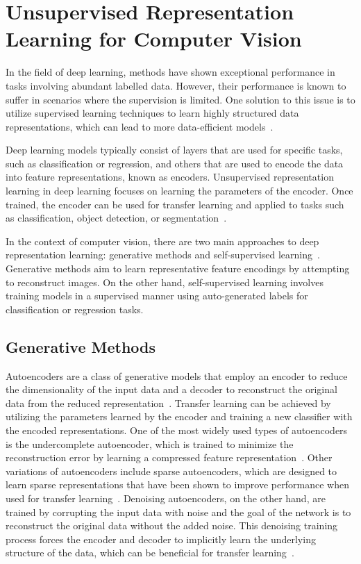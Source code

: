 \section{Unsupervised Representation Learning for Computer Vision}
\label{subsec:unsupervised_representation}
In the field of deep learning, methods have shown exceptional performance in tasks involving abundant labelled data. However, their performance is known to suffer in scenarios where the supervision is limited. One solution to this issue is to utilize supervised learning techniques to learn highly structured data representations, which can lead to more data-efficient models~\citep{lake2015human}.

Deep learning models typically consist of layers that are used for specific tasks, such as classification or regression, and others that are used to encode the data into feature representations, known as encoders. Unsupervised representation learning in deep learning focuses on learning the parameters of the encoder. Once trained, the encoder can be used for transfer learning and applied to tasks such as classification, object detection, or segmentation~\citep{weiss2016survey}.

In the context of computer vision, there are two main approaches to deep representation learning: generative methods and self-supervised learning~\citep{bengio2013representation}. Generative methods aim to learn representative feature encodings by attempting to reconstruct images. On the other hand, self-supervised learning involves training models in a supervised manner using auto-generated labels for classification or regression tasks.

\subsection{Generative Methods}
\label{subsec:generative_methods}
Autoencoders are a class of generative models that employ an encoder to reduce the dimensionality of the input data and a decoder to reconstruct the original data from the reduced representation~\citep{kramer1991nonlinear}. Transfer learning can be achieved by utilizing the parameters learned by the encoder and training a new classifier with the encoded representations. One of the most widely used types of autoencoders is the undercomplete autoencoder, which is trained to minimize the reconstruction error by learning a compressed feature representation~\citep{goodfellow2016deep}. Other variations of autoencoders include sparse autoencoders, which are designed to learn sparse representations that have been shown to improve performance when used for transfer learning~\citep{makhzani2013k}. Denoising autoencoders, on the other hand, are trained by corrupting the input data with noise and the goal of the network is to reconstruct the original data without the added noise. This denoising training process forces the encoder and decoder to implicitly learn the underlying structure of the data, which can be beneficial for transfer learning~\citep{bengio2013generalized}.

